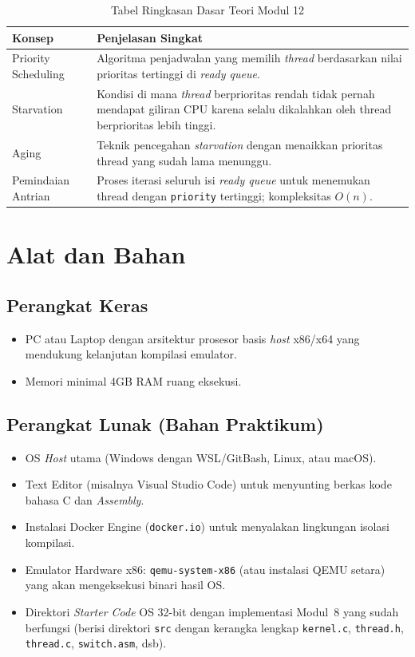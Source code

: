 \begin{table}[h]
	\caption{Tabel Ringkasan Dasar Teori Modul 12}
	\label{tab:m12-dasar-teori}
	\centering
	\begin{tabulary}{\textwidth}{|L|L|}
		\hline
		\textbf{Konsep} & \textbf{Penjelasan Singkat} \\ \hline
		Priority Scheduling
		& Algoritma penjadwalan yang memilih \textit{thread} berdasarkan nilai prioritas tertinggi di \textit{ready queue}. \\ \hline
		Starvation
		& Kondisi di mana \textit{thread} berprioritas rendah tidak pernah mendapat giliran CPU karena selalu dikalahkan oleh thread berprioritas lebih tinggi. \\ \hline
		Aging
		& Teknik pencegahan \textit{starvation} dengan menaikkan prioritas thread yang sudah lama menunggu. \\ \hline
		Pemindaian Antrian
		& Proses iterasi seluruh isi \textit{ready queue} untuk menemukan thread dengan \texttt{priority} tertinggi; kompleksitas $O(n)$. \\ \hline
	\end{tabulary}
\end{table}

\newpage
\section{Alat dan Bahan}
\label{sec:m12-alat-bahan}

\subsection{Perangkat Keras}
\begin{itemize}
	\item PC atau Laptop dengan arsitektur prosesor basis \textit{host} x86/x64 yang mendukung kelanjutan kompilasi emulator.
	\item Memori minimal 4GB RAM ruang eksekusi.
\end{itemize}

\subsection{Perangkat Lunak (Bahan Praktikum)}
\begin{itemize}
	\item OS \textit{Host} utama (Windows dengan WSL/GitBash, Linux, atau macOS).
	\item Text Editor (misalnya Visual Studio Code) untuk menyunting berkas kode bahasa C dan \textit{Assembly}.
	\item Instalasi Docker Engine (\texttt{docker.io}) untuk menyalakan lingkungan isolasi kompilasi.
	\item Emulator Hardware x86: \texttt{qemu-system-x86} (atau instalasi QEMU setara) yang akan mengeksekusi binari hasil OS.
	\item Direktori \textit{Starter Code} OS 32-bit dengan implementasi Modul~8 yang sudah berfungsi (berisi direktori \texttt{src} dengan kerangka lengkap \texttt{kernel.c}, \texttt{thread.h}, \texttt{thread.c}, \texttt{switch.asm}, dsb).
\end{itemize}

